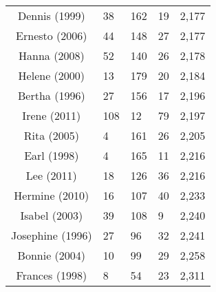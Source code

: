 \begin{table}[ht]
\begin{tabular}{cP{3cm}P{3cm}P{3cm}P{3cm}}
  Dennis (1999) & 38 & 162 & 19 & 2,177 \\ 
  Ernesto (2006) & 44 & 148 & 27 & 2,177 \\ 
  Hanna (2008) & 52 & 140 & 26 & 2,178 \\ 
  Helene (2000) & 13 & 179 & 20 & 2,184 \\ 
  Bertha (1996) & 27 & 156 & 17 & 2,196 \\ 
  Irene (2011) & 108 & 12 & 79 & 2,197 \\ 
  Rita (2005) & 4 & 161 & 26 & 2,205 \\ 
  Earl (1998) & 4 & 165 & 11 & 2,216 \\ 
  Lee (2011) & 18 & 126 & 36 & 2,216 \\ 
  Hermine (2010) & 16 & 107 & 40 & 2,233 \\ 
  Isabel (2003) & 39 & 108 & 9 & 2,240 \\ 
  Josephine (1996) & 27 & 96 & 32 & 2,241 \\ 
  Bonnie (2004) & 10 & 99 & 29 & 2,258 \\ 
  Frances (1998) & 8 & 54 & 23 & 2,311 \\ 
   \bottomrule
\end{tabular}
\end{table}
